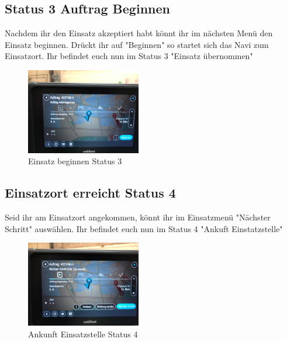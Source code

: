\documentclass[a4paper,12pt]{scrartcl}
\begin{document}
    \subsection{Status 3 Auftrag Beginnen}
    Nachdem ihr den Einsatz akzeptiert habt könnt ihr im nächsten Menü den Einsatz beginnen. Drückt ihr auf "Beginnen"
    so startet sich das Navi zum Einsatzort. Ihr befindet euch nun im Status 3 "Einsatz übernommen"
    \begin{figure}[h]
        \begin{center}
            \includegraphics[width=5cm]{bilder/beginnen.jpg}
            \caption{Einsatz beginnen Status 3}
            \label{beginnen}
        \end{center}     
    \end{figure}
    
    \newpage
    \subsection{Einsatzort erreicht Status 4}
    Seid ihr am Einsatzort angekommen, könnt ihr im Einsatzmenü "Nächster Schritt" auswählen. Ihr befindet euch nun im Status 4 "Ankuft Einstatzstelle"
    \begin{figure}[h]
        \begin{center}
            \includegraphics[width=5cm]{bilder/einsatzort.jpg}
            \caption{Ankunft Einsatzstelle Status 4}
            \label{ankunft Einsatzstelle}
        \end{center} 
    \end{figure}
    
\end{document}
